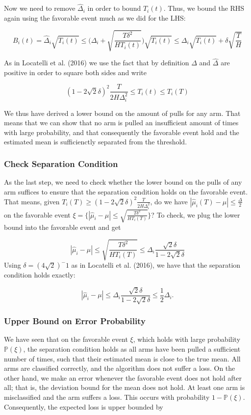 \documentclass[12pt,]{article}
\begin{document}
Now we need to remove \(\hat{\Delta}_i\) in order to bound \(T_i(t)\).
Thus, we bound the RHS again using the favorable event much as we did
for the LHS:

\[
B_i(t) = \hat{\Delta}_i \sqrt{T_i(t)} \leq \Big(\Delta_i + \sqrt{\frac{T\delta^2}{HT_i(t)}}\Big) \sqrt{T_i(t)} \leq \Delta_i \sqrt{T_i(t)} + \delta \sqrt{\frac{T}{H}}
\]

As in Locatelli et al. (2016) we use the fact that by definition
\(\Delta\) and \(\hat{\Delta}\) are positive in order to square both
sides and write

\[
(1 - 2\sqrt{2}\delta)^2 \frac{T}{2H\Delta^2_i} \leq T_i(t) \leq T_i(T)
\]

We thus have derived a lower bound on the amount of pulls for any arm.
That means that we can show that no arm is pulled an insufficient amount
of times with large probability, and that consequently the favorable
event hold and the estimated mean is sufficienctly separated from the
threshold.

\subsubsection{Check Separation
Condition}\label{check-separation-condition}

As the last step, we need to check whether the lower bound on the pulls
of any arm suffices to ensure that the separation condition holds on the
favorable event. That means, given
\(T_i(T) \geq (1-2\sqrt{2}\delta)^2 \frac{T}{2H\Delta_i^2}\), do we have
\(|\hat{\mu}_i(T) - \mu | \leq \frac{\Delta}{2}\) on the favorable event
\(\xi = \Big\{|\hat{\mu}_i - \mu | \leq \sqrt{\frac{T\delta^2}{H T_i(T)}}\Big\}\)?
To check, we plug the lower bound into the favorable event and get

\[
|\hat{\mu}_i - \mu | \leq \sqrt{\frac{T\delta^2}{H T_i(T)}} \leq \Delta_i \frac{\sqrt{2}\delta}{1-2\sqrt{2}\delta}
\] Using \(\delta = (4\sqrt{2})^-1\) as in Locatelli et al. (2016), we
have that the separation condition holds exactly:

\[
|\hat{\mu}_i - \mu | \leq \Delta_i \frac{\sqrt{2}\delta}{1-2\sqrt{2}\delta} \leq \frac{1}{2}\Delta_i.
\]

\subsubsection{Upper Bound on Error
Probability}\label{upper-bound-on-error-probability}

We have seen that on the favorable event \(\xi\), which holds with large
probability \(\mathbb{P}(\xi)\), the separation condition holds as all
arms have been pulled a sufficient number of times, such that their
estimated mean is close to the true mean. All arms are classified
correctly, and the algorithm does not suffer a loss. On the other hand,
we make an error whenever the favorable event does not hold after all;
that is, the deviation bound for the mean does not hold. At least one
arm is misclassified and the arm suffers a loss. This occurs with
probability \(1-\mathbb{P}(\xi)\). Consequently, the expected loss is
upper bounded by
\end{document}

